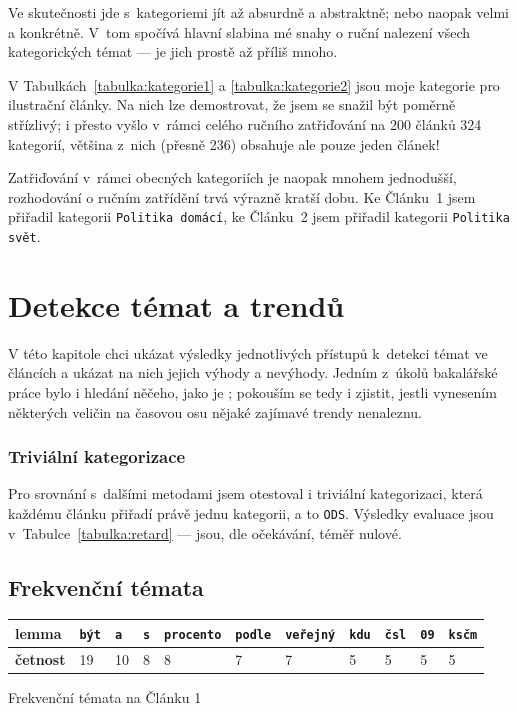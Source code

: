 \documentclass[12pt,a4paper]{report}
\begin{document}
Ve skutečnosti jde s~kategoriemi jít až absurdně  a abstraktně; nebo naopak velmi  a konkrétně. V~tom spočívá hlavní slabina mé snahy o ruční nalezení všech kategorických témat --- je jich prostě až příliš mnoho.

V Tabulkách~\ref{tabulka:kategorie1} a \ref{tabulka:kategorie2} jsou moje kategorie pro ilustrační články. Na nich lze demostrovat, že jsem se snažil být poměrně střízlivý; i přesto vyšlo v~rámci celého ručního zatřiďování na 200 článků 324 kategorií, většina z~nich (přesně 236) obsahuje ale pouze jeden článek!

Zatřiďování v~rámci obecných kategoriích je naopak mnohem jednodušší, roz\-ho\-do\-vá\-ní o ručním zatřídění trvá výrazně kratší dobu. Ke Článku~1 jsem přiřadil kategorii \texttt{Politika domácí}, ke Článku~2 jsem přiřadil kategorii \texttt{Politika svět}.

\section{Detekce témat a trendů}
\label{sec:hledanitemat_prezentace_vysledku}

V této kapitole chci ukázat výsledky jednotlivých přístupů k~detekci témat ve článcích a ukázat na nich jejich výhody a nevýhody. Jedním z~úkolů bakalářské práce bylo i hledání něčeho, jako je ; pokouším se tedy i zjistit, jestli vynesením některých veličin na časovou osu nějaké zajímavé trendy nenaleznu.


\subsubsection{Triviální kategorizace}




Pro srovnání s~dalšími metodami jsem otestoval i triviální kategorizaci, která každému článku přiřadí právě jednu kategorii, a to \texttt{ODS}. Výsledky evaluace jsou v~Tabulce~\ref{tabulka:retard} --- jsou, dle očekávání, téměř nulové.

\subsection{Frekvenční témata}
\label{sec:ftemata}

{
 \begin{tabular}{ |l |l | l | l | l | l | l | l | l | l | l | }
        \hline
        \textbf{lemma} & \texttt{být} & \texttt{a} & \texttt{s} & \texttt{procento} & \texttt{podle} & \texttt{veřejný} & \texttt{kdu} & \texttt{čsl} & \texttt{09} & \texttt{ksčm} \\ \hline
        \textbf{četnost}  & 19 & 10 & 8 & 8 & 7 & 7 & 5 & 5 & 5 & 5 \\ \hline
\end{tabular}
} {Frekvenční témata na Článku 1} 
\end{document}
